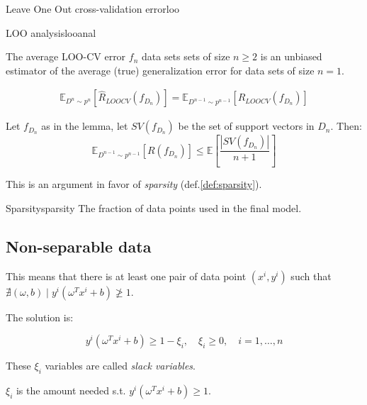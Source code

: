 \begin{definition}{Leave One Out cross-validation error}{loo}
\end{definition}

\begin{theorem}{LOO analysis}{looanal}
	\begin{lemma}{
			The average LOO-CV error $f_n$ data sets sets of size $n \geq 2$
			is an unbiased estimator of the average (true) generalization
			error for data sets of size $n=1$.
		}

		\begin{align*}
			\mathds{E}_{D^n \sim p^n}
			\left[ \hat{R}_{LOOCV}(f_{D_n}) \right] =
			\mathds{E}_{D^{n-1} \sim p^{n-1}} \left[{R_{LOOCV}(f_{D_n})} \right]
		\end{align*}
	\end{lemma}

	Let $f_{D_n}$ as in the lemma, let $SV(f_{D_n})$ be the set of
	support vectors in $D_n$. Then:
	\begin{equation*}
		\mathds{E}_{D^{n-1} \sim p^{n-1}} \left[{R(f_{D_n})} \right]
		\leq \mathds{E} \left[
			\frac{\left| SV(f_{D_n}) \right|}{n + 1}
			\right]
	\end{equation*}

	This is an argument in favor of \emph{sparsity} (def.\ref{def:sparsity}).
\end{theorem}

\begin{definition}{Sparsity}{sparsity}
	The fraction of data points used in the final model.
\end{definition}

\subsection*{Non-separable data}

This means that there is at least one pair of data point $(x^i, y^i)$
such that $\nexists (\omega, b) \mid y^i (\omega^T x^i + b) \ngeq 1$.

The solution is:

\begin{equation*}
	y^i (\omega^T x^i + b) \geq 1 - \xi_i, \quad \xi_i \geq 0,\quad
	i=1,\dots,n
\end{equation*}

These $\xi_i$ variables are called \emph{slack variables}.

$\xi_i$ is the amount needed s.t. $y^i (\omega^T x^i + b) \geq 1$.

